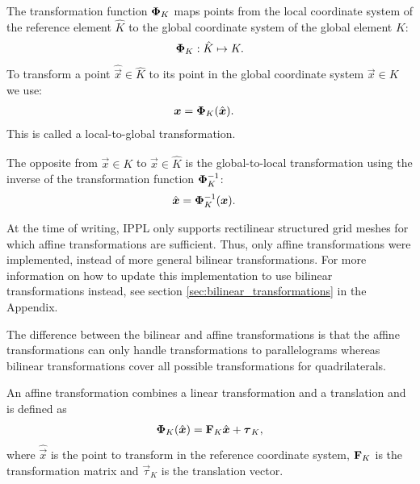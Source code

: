 \begin{definition}
    The transformation function  $\mathbf{\Phi}_K$ maps points from the local coordinate system of the reference element $\hat{K}$ to
    the global coordinate system of the global element $K$:
    \begin{align}
        \mathbf{\Phi}_K: \hat{K} \mapsto K.
    \end{align}
    To transform a point $\hat{\vec{x}} \in \hat{K}$ to its point in the global coordinate system $\vec{x} \in K$ we use:
    \begin{align}
        \boldsymbol{x} & = \mathbf{\Phi}_K(\hat{\boldsymbol{x}}).
    \end{align}
    This is called a local-to-global transformation.

    The opposite from $\vec{x} \in K$ to $\hat{\vec{x}} \in \hat{K}$ is the global-to-local transformation using the inverse
    of the transformation function $\mathbf{\Phi}^{-1}_K$:
    \begin{align}
        \hat{\boldsymbol{x}} & = \mathbf{\Phi}^{-1}_K(\boldsymbol{x}).
    \end{align}
\end{definition}

At the time of writing, IPPL only supports rectilinear structured grid meshes for which affine transformations are sufficient.
Thus, only affine transformations were implemented, instead of more general bilinear transformations.
For more information on how to update this implementation to use bilinear transformations instead, see
section \ref{sec:bilinear_transformations} in the Appendix.

The difference between the bilinear and affine transformations is that the affine transformations can only
handle transformations to parallelograms whereas bilinear transformations cover all possible transformations for quadrilaterals.

\begin{definition}
    \label{def:affine_trans}
    An affine transformation combines a linear transformation and a translation and is defined as
    \begin{align}
        \mathbf{\Phi}_K(\hat{\boldsymbol{x}}) = \mathbf{F}_K \hat{\boldsymbol{x}} + \boldsymbol{\tau}_K,
    \end{align}
    where $\hat{\vec{x}}$ is the point to transform in the reference coordinate system, $\mathbf{F}_K$ is
    the transformation matrix and $\vec{\tau}_K$ is the translation vector.
\end{definition}

